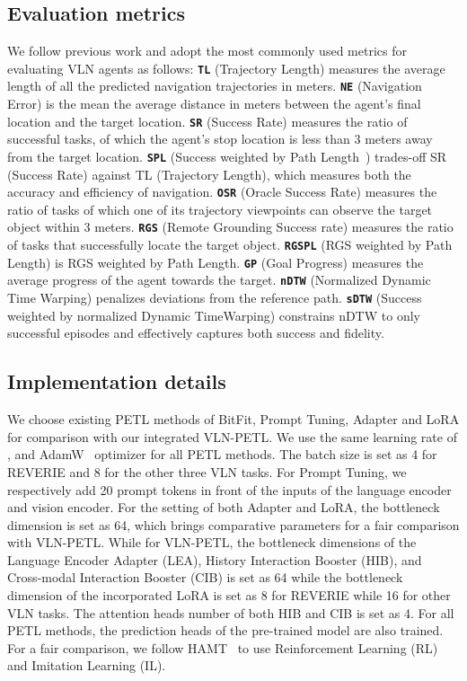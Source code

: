 \documentclass[10pt,twocolumn,letterpaper]{article}
\begin{document}
\subsection{Evaluation metrics}
We follow previous work and adopt the most commonly used metrics for evaluating VLN agents as follows: \textbf{\texttt{TL}} (Trajectory Length) measures the average length of all the predicted navigation trajectories in meters. 
\textbf{\texttt{NE}} (Navigation Error) is the mean the average distance in meters between the agent's final location and the target location. 
\textbf{\texttt{SR}} (Success Rate) measures the ratio of successful tasks, of which the agent's stop location is less than 3 meters away from the target location.
\textbf{\texttt{SPL}} (Success weighted by Path Length~\cite{spl}) trades-off SR (Success Rate) against TL (Trajectory Length), which measures both the accuracy and efficiency of navigation. \textbf{\texttt{OSR}} (Oracle Success Rate) measures the ratio of tasks of which one of its trajectory viewpoints can observe the target object within 3 meters. 
\textbf{\texttt{RGS}} (Remote Grounding Success rate) measures the ratio of tasks that successfully locate the target object.
\textbf{\texttt{RGSPL}} (RGS weighted by Path Length) is RGS weighted by Path Length.
\textbf{\texttt{GP}} (Goal Progress) measures the average progress of the agent towards the target.
\textbf{\texttt{nDTW}} (Normalized Dynamic
Time Warping) penalizes deviations from the reference path.
\textbf{\texttt{sDTW}} (Success weighted by normalized Dynamic TimeWarping) constrains nDTW to only successful episodes and effectively captures both success and fidelity.

\subsection{Implementation details}
We choose existing PETL methods of BitFit, Prompt Tuning, Adapter and LoRA for comparison with our integrated VLN-PETL. We use the same learning rate of , and AdamW~\cite{adamw} optimizer for all PETL methods. The batch size is set as 4 for REVERIE and 8 for the other three VLN tasks. For Prompt Tuning, we respectively add 20 prompt tokens in front of the inputs of the language encoder and vision encoder. For the setting of both Adapter and LoRA, the bottleneck dimension  is set as 64, which brings comparative parameters for a fair comparison with VLN-PETL. While for VLN-PETL, the bottleneck dimensions  of the Language Encoder Adapter (LEA), History Interaction Booster (HIB), and Cross-modal Interaction Booster (CIB) is set as 64 while the bottleneck dimension of the incorporated LoRA is set as 8 for REVERIE while 16 for other VLN tasks. The attention heads number of both HIB and CIB is set as 4. For all PETL methods, the prediction heads of the pre-trained model are also trained. 
For a fair comparison, we follow HAMT~\cite{hamt} to use Reinforcement Learning (RL) and Imitation Learning (IL).
\end{document}
